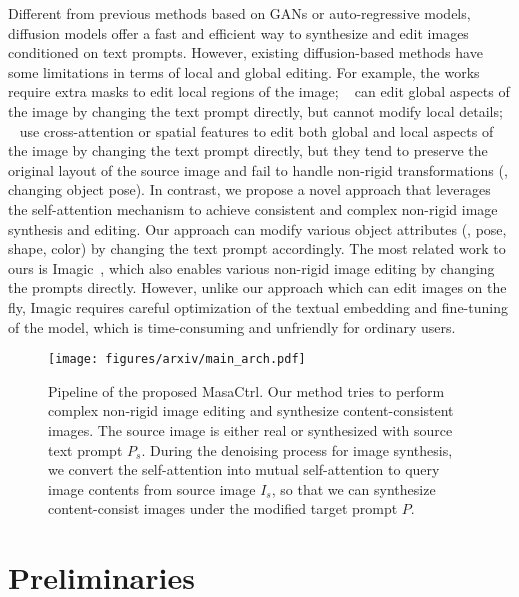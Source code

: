 \documentclass[10pt,twocolumn,letterpaper]{article}
\begin{document}
Different from previous methods based on GANs or auto-regressive models, diffusion models offer a fast and efficient way to synthesize and edit images conditioned on text prompts. However, existing diffusion-based methods have some limitations in terms of local and global editing. For example, the works~\cite{nichol2021glide, avrahami2022blended} require extra masks to edit local regions of the image; ~\cite{kim2022diffusionclip} can edit global aspects of the image by changing the text prompt directly, but cannot modify local details; ~\cite{hertz2022prompt,tumanyan2022plug} use cross-attention or spatial features to edit both global and local aspects of the image by changing the text prompt directly, but they tend to preserve the original layout of the source image and fail to handle non-rigid transformations (\eg, changing object pose). In contrast, we propose a novel approach that leverages the self-attention mechanism to achieve consistent and complex non-rigid image synthesis and editing. Our approach can modify various object attributes (\eg, pose, shape, color) by changing the text prompt accordingly. The most related work to ours is Imagic~\cite{kawar2022imagic}, which also enables various non-rigid image editing by changing the prompts directly. However, unlike our approach which can edit images on the fly, Imagic requires careful optimization of the textual embedding and fine-tuning of the model, which is time-consuming and unfriendly for ordinary users.


\begin{figure*}
    \centering
    \texttt{[image: figures/arxiv/main\_arch.pdf]}
    \caption{Pipeline of the proposed MasaCtrl. Our method tries to perform complex non-rigid image editing and synthesize content-consistent images. The source image is either real or synthesized with source text prompt $P_s$. During the denoising process for image synthesis, we convert the self-attention into mutual self-attention to query image contents from source image $I_s$, so that we can synthesize content-consist images under the modified target prompt $P$. } 
    \label{fig:main_arch}
\end{figure*}

\section{Preliminaries}
\end{document}
